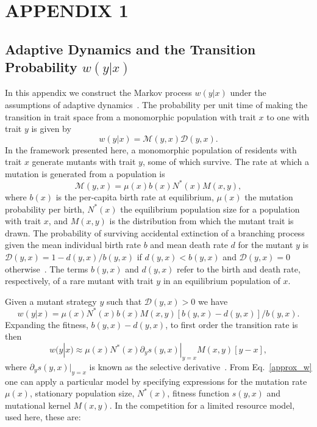 

\chapter{APPENDIX 1}
 
\section{Adaptive Dynamics and the Transition Probability $w(y|x)$}\label{AdaptiveDynamics}
 
In this appendix we construct the Markov process $w(y|x)$ under the assumptions of adaptive dynamics~\citep{dieckmann_jmb1996}.  The probability per unit time of making the transition in trait space from a monomorphic population with trait $x$ to one with trait $y$ is given by
\begin{equation}
	w(y|x)=\mathcal{M}(y,x)\mathcal{D}(y,x).
\end{equation}
In the framework presented here, a monomorphic population of residents  with trait $x$ generate mutants with trait $y$, some of which survive.
The rate at which a mutation is generated from a population is 
\begin{equation}
	\mathcal{M}(y,x) = \mu(x) b(x) N^{\ast}(x)M(x, y),
\end{equation}
where $b(x)$ is the per-capita birth rate at equilibrium, $\mu(x)$ the mutation probability per birth, $N^{\ast}(x)$ the equilibrium population size for a population with trait $x$, and $M(x, y)$ is the distribution from which the mutant trait is drawn.  The probability of surviving accidental extinction of a branching process given the mean individual birth rate $b$ and mean death rate $d$ for the mutant $y$ is $\mathcal{D}(y,x)=1-d(y,x)/b(y,x)$ if $d(y,x)<b(y,x)$ and $\mathcal{D}(y,x)=0$ otherwise~\citep{feller1968}.  The terms $b(y,x)$ and $d(y,x)$ refer to the birth and death rate, respectively, of a rare mutant with trait $y$ in an equilibrium population of $x$.  
 
Given a mutant strategy $y$ such that $\mathcal{D}(y,x)>0$ we have
\begin{equation}
	\label{solved_w}
	w(y|x) = \mu(x) N^{\ast}(x) b(x) M(x, y)[b(y,x) - d(y,x)]/b(y,x).
\end{equation}
Expanding the fitness, $b(y,x)-d(y,x)$, to first order 
the transition rate is then
\begin{equation}
	\label{approx_w}
	w(y|x) \approx \mu(x) N^{\ast}(x) \partial_y s(y,x)|_{y=x} M(x, y)[y-x] ,
\end{equation}
where $\partial_y s(y,x)|_{y=x}$ is known as the selective derivative~\citep{geritz_prl1997}.  From Eq.~\eqref{approx_w} one can apply a particular model by specifying expressions for the mutation rate $\mu(x)$, stationary population size, $N^{\ast}(x)$, fitness function $s(y,x)$ and mutational kernel $M(x,y)$.  In the competition for a limited resource model,~\citep{dieckmann_nat1999} used here, these are:
 
